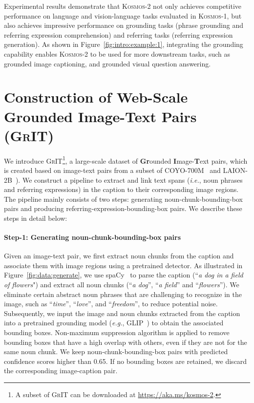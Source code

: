 \documentclass{article}
\newcommand\kosmos{\textsc{Kosmos-1}}
\newcommand\our{\textsc{Kosmos-2}}
\newcommand\ie{\textit{i.e.}}
\newcommand\eg{\textit{e.g.}}
\begin{document}
Experimental results demonstrate that \our{} not only achieves competitive performance on language and vision-language tasks evaluated in \kosmos{}, but also achieves impressive performance on grounding tasks (phrase grounding and referring expression comprehension) and referring tasks (referring expression generation).
As shown in Figure~\ref{fig:intro:example:1}, integrating the grounding capability enables \our{} to be used for more downstream tasks, such as grounded image captioning, and grounded visual question answering.


\section{Construction of Web-Scale Grounded Image-Text Pairs (\textsc{GrIT})}

We introduce \textsc{GrIT}\footnote{A subset of \textsc{GrIT} can be downloaded at \url{https://aka.ms/kosmos-2}.}, a large-scale dataset of \textbf{Gr}ounded \textbf{I}mage-\textbf{T}ext pairs, which is created based on image-text pairs from a subset of COYO-700M~\cite{coyo700m} and LAION-2B~\cite{laion5b}).
We construct a pipeline to extract and link text spans (\ie, noun phrases and referring expressions) in the caption to their corresponding image regions.
The pipeline mainly consists of two steps: generating noun-chunk-bounding-box pairs and producing referring-expression-bounding-box pairs. 
We describe these steps in detail below:

\paragraph{Step-1: Generating noun-chunk-bounding-box pairs}
Given an image-text pair, we first extract noun chunks from the caption and associate them with image regions using a pretrained detector.
As illustrated in Figure~\ref{fig:data:generate}, we use spaCy~\cite{spacy} to parse the caption (``\textit{a dog in a field of flowers}") and extract all noun chunks (``\textit{a dog}'', ``\textit{a field}'' and ``\textit{flowers}'').
We eliminate certain abstract noun phrases that are challenging to recognize in the image, such as ``\textit{time}'', ``\textit{love}'', and ``\textit{freedom}'', to reduce potential noise.
Subsequently, we input the image and noun chunks extracted from the caption into a pretrained grounding model (\eg, GLIP~\cite{glip}) to obtain the associated bounding boxes. 
Non-maximum suppression algorithm is applied to remove bounding boxes that have a high overlap with others, even if they are not for the same noun chunk. 
We keep noun-chunk-bounding-box pairs with predicted confidence scores higher than 0.65.
If no bounding boxes are retained, we discard the corresponding image-caption pair.
\end{document}
